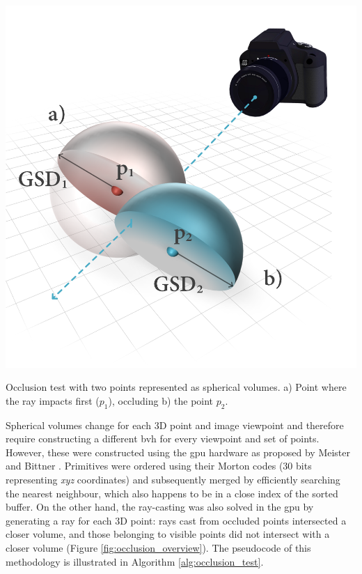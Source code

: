 \begin{marginfigure}[.0cm]
	\centering
	\includegraphics{figs/thermal_projection/occlusion_spheres.png}
	\caption{Occlusion test with two points represented as spherical volumes. a) Point where the ray impacts first ($p_1$), occluding b) the point $p_2$.}
	\label{fig:occlusion_overview}
\end{marginfigure}
Spherical volumes change for each 3D point and image viewpoint and therefore require constructing a different \acrshort{bvh} for every viewpoint and set of points. However, these were constructed using the \acrshort{gpu} hardware as proposed by Meister and Bittner \cite{meister_parallel_2018}. Primitives were ordered using their Morton codes (30 bits representing \textit{xyz} coordinates) and subsequently merged by efficiently searching the nearest neighbour, which also happens to be in a close index of the sorted buffer. On the other hand, the ray-casting was also solved in the \acrshort{gpu} by generating a ray for each 3D point: rays cast from occluded points intersected a closer volume, and those belonging to visible points did not intersect with a closer volume (Figure \ref{fig:occlusion_overview}). The pseudocode of this methodology is illustrated in Algorithm \ref{alg:occlusion_test}.

